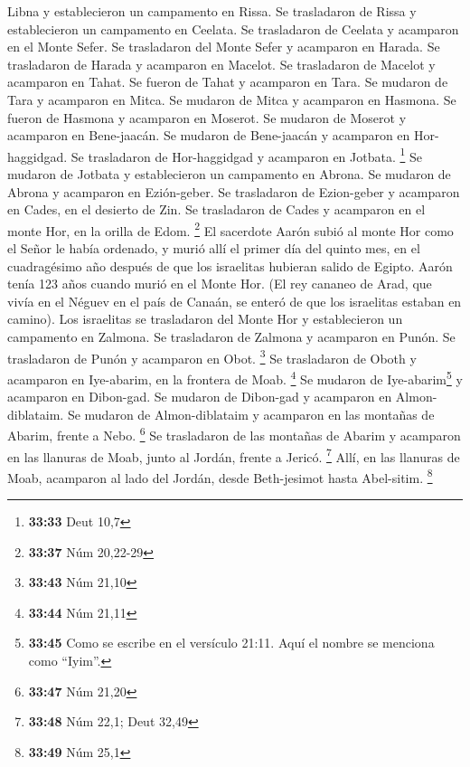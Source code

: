 Libna y establecieron un campamento en Rissa.  Se
trasladaron de Rissa y establecieron un campamento en Ceelata.
 Se trasladaron de Ceelata y acamparon en el Monte Sefer.
 Se trasladaron del Monte Sefer y acamparon en Harada.
 Se trasladaron de Harada y acamparon en Macelot.
 Se trasladaron de Macelot y acamparon en Tahat.
 Se fueron de Tahat y acamparon en Tara. 
Se mudaron de Tara y acamparon en Mitca.  Se mudaron de
Mitca y acamparon en Hasmona.  Se fueron de Hasmona y
acamparon en Moserot.  Se mudaron de Moserot y acamparon
en Bene-jaacán.  Se mudaron de Bene-jaacán y acamparon en
Hor-haggidgad.  Se trasladaron de Hor-haggidgad y
acamparon en Jotbata. \footnote{\textbf{33:33} Deut 10,7}
 Se mudaron de Jotbata y establecieron un campamento en
Abrona.  Se mudaron de Abrona y acamparon en Ezión-geber.
 Se trasladaron de Ezion-geber y acamparon en Cades, en
el desierto de Zin.  Se trasladaron de Cades y acamparon
en el monte Hor, en la orilla de Edom. \footnote{\textbf{33:37} Núm
  20,22-29}  El sacerdote Aarón subió al monte Hor como
el Señor le había ordenado, y murió allí el primer día del quinto mes,
en el cuadragésimo año después de que los israelitas hubieran salido de
Egipto.  Aarón tenía 123 años cuando murió en el Monte
Hor.  (El rey cananeo de Arad, que vivía en el Néguev en
el país de Canaán, se enteró de que los israelitas estaban en camino).
 Los israelitas se trasladaron del Monte Hor y
establecieron un campamento en Zalmona.  Se trasladaron
de Zalmona y acamparon en Punón.  Se trasladaron de Punón
y acamparon en Obot. \footnote{\textbf{33:43} Núm 21,10} 
Se trasladaron de Oboth y acamparon en Iye-abarim, en la frontera de
Moab. \footnote{\textbf{33:44} Núm 21,11}  Se mudaron de
Iye-abarim\footnote{\textbf{33:45} Como se escribe en el versículo
  21:11. Aquí el nombre se menciona como ``Iyim''.} y acamparon en
Dibon-gad.  Se mudaron de Dibon-gad y acamparon en
Almon-diblataim.  Se mudaron de Almon-diblataim y
acamparon en las montañas de Abarim, frente a Nebo. \footnote{\textbf{33:47}
  Núm 21,20}  Se trasladaron de las montañas de Abarim y
acamparon en las llanuras de Moab, junto al Jordán, frente a Jericó.
\footnote{\textbf{33:48} Núm 22,1; Deut 32,49}  Allí, en
las llanuras de Moab, acamparon al lado del Jordán, desde Beth-jesimot
hasta Abel-sitim. \footnote{\textbf{33:49} Núm 25,1}

